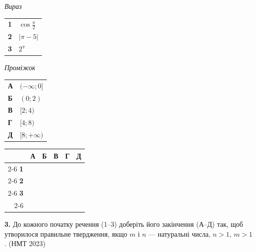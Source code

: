 \documentclass[14pt]{extarticle}
\newcommand{\answerGrid}{
    \begingroup
    \setlength{\tabcolsep}{4pt}
    \renewcommand{\arraystretch}{1.2}
    \small
    \begin{tabular}{r|c|c|c|c|c|}
         \multicolumn{1}{c}{} & \multicolumn{1}{c}{\textbf{А}} & \multicolumn{1}{c}{\textbf{Б}} & \multicolumn{1}{c}{\textbf{В}} & \multicolumn{1}{c}{\textbf{Г}} & \multicolumn{1}{c}{\textbf{Д}} \\ \cline{2-6}
         \textbf{1} & & & & & \\ \cline{2-6}
         \textbf{2} & & & & & \\ \cline{2-6}
         \textbf{3} & & & & & \\ \cline{2-6}
    \end{tabular}
    \endgroup
}
\newcommand{\nmtyear}[1]{\hfill{\small\color{yearcolor}(НМТ #1)}}
\begin{document}
\noindent
\begin{minipage}[t]{0.45\textwidth}
    \textit{Вираз} \par \vspace{0.2cm}
    \begin{tabular}{@{}p{0.5cm} l@{}}
    \textbf{1} & $\cos \displaystyle\frac{\pi}{2}$ \\[0.5cm]
    \textbf{2} & $|\pi - 5|$ \\[0.4cm]
    \textbf{3} & \colorbox{yellow!30}{$2^\pi$} \\
    \end{tabular}
\end{minipage}%
\hfill
\begin{minipage}[t]{0.50\textwidth}
    \textit{Проміжок} \par \vspace{0.2cm}
    \begin{tabular}{@{}p{0.5cm} p{7cm}@{}}
    \textbf{А} & $(-\infty; 0]$ \\[0.2cm]
    \textbf{Б} & $(0; 2)$ \\[0.2cm]
    \textbf{В} & $[2; 4)$ \\[0.2cm]
    \textbf{Г} & $[4; 8)$ \\[0.2cm]
    \textbf{Д} & $[8; +\infty)$ \\
    \end{tabular}
\end{minipage}
\vspace{0.3cm}

\answerGrid
\vspace{0.7cm}

\noindent\textbf{3.} До кожного початку речення (1–3) доберіть його закінчення (А–Д) так, щоб утворилося правильне твердження, якщо $m$ і $n$ --- натуральні числа, $n > 1$, $m > 1$. \nmtyear{2023}
\vspace{0.3cm}
\end{document}
